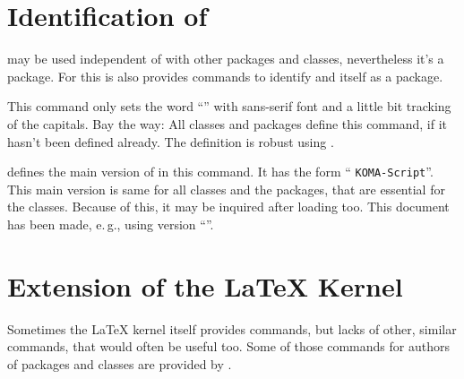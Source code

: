 %
%
%
%
%


\section{Identification of \KOMAScript}
\label{sec:scrbase.identify}

 may be used independent of \KOMAScript{} with
other packages and classes, nevertheless it's a \KOMAScript{} package. For
this is also provides commands to identify \KOMAScript{} and itself as a
\KOMAScript{} package.

\begin{Declaration}
\end{Declaration}
%
This command only sets the word ``\KOMAScript'' with sans-serif font and
a little bit tracking of the capitals. Bay the way: All \KOMAScript{} classes
and packages define this command, if it hasn't been defined already. The
definition is robust using .
%


\begin{Declaration}
\end{Declaration}
%
\KOMAScript{} defines the main version of \KOMAScript{} in this command. It
has the form ``  \texttt{KOMA-Script}''. This main
version is same for all \KOMAScript{} classes and the \KOMAScript{} packages,
that are essential for the classes. Because of this, it may be inquired after
loading  too. This document has been made, e.\,g., using
\KOMAScript{} version ``\KOMAScriptVersion''.
%
%


\section{Extension of the \LaTeX{} Kernel}
\label{sec:scrbase:latexkernel}

Sometimes the \LaTeX{} kernel itself provides commands, but lacks of other,
similar commands, that would often be useful too. Some of those commands for
authors of packages and classes are provided by .

